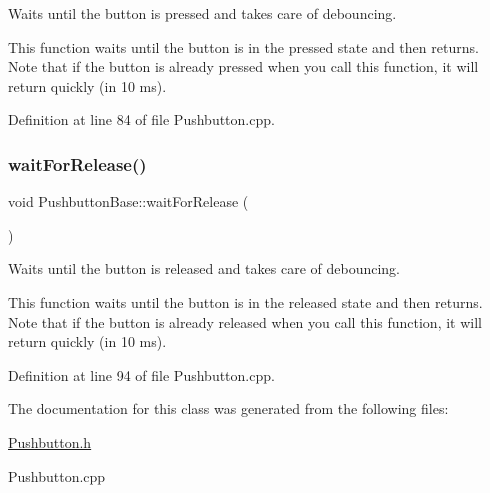Waits until the button is pressed and takes care of debouncing. 

This function waits until the button is in the pressed state and then returns. Note that if the button is already pressed when you call this function, it will return quickly (in 10 ms). 

Definition at line 84 of file Pushbutton.\+cpp.

\mbox{\label{class_pushbutton_base_ae5fff34b3e1ebd62fd02b99edd6bf13a}} 
\subsubsection{\texorpdfstring{wait\+For\+Release()}{waitForRelease()}}
{\footnotesize\ttfamily void Pushbutton\+Base\+::wait\+For\+Release (\begin{DoxyParamCaption}{ }\end{DoxyParamCaption})}



Waits until the button is released and takes care of debouncing. 

This function waits until the button is in the released state and then returns. Note that if the button is already released when you call this function, it will return quickly (in 10 ms). 

Definition at line 94 of file Pushbutton.\+cpp.



The documentation for this class was generated from the following files\+:\begin{DoxyCompactItemize}
\item 
\hyperlink{_pushbutton_8h}{Pushbutton.\+h}\item 
Pushbutton.\+cpp\end{DoxyCompactItemize}
